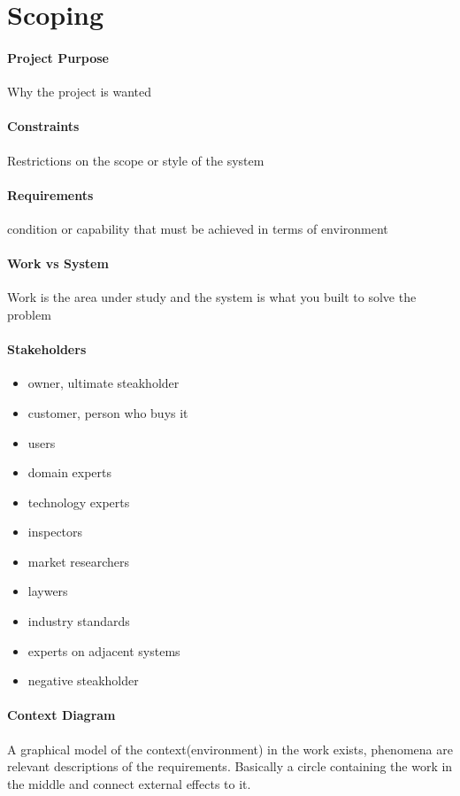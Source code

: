\documentclass[12pt]{article}
\begin{document}
\section*{Scoping}
\label{sec:scoping}
\paragraph{Project Purpose} 
\label{par:project_purpose}
Why the project is wanted

\paragraph{Constraints} 
\label{par:constraints}	
Restrictions on the scope or style of the system

\paragraph{Requirements} 
\label{par:requriements}
condition or capability that must be achieved in terms of environment
	
\paragraph{Work vs System} 
\label{par:work_vs_system}
Work is the area under study and the system is what you built to solve the problem

\paragraph{Stakeholders} 
\label{par:stakeholders}
\begin{itemize}
	\item owner, ultimate steakholder
	\item customer, person who buys it
	\item users
	\item domain experts
	\item technology experts
	\item inspectors
	\item market researchers
	\item laywers
	\item industry standards
	\item experts on adjacent systems
	\item negative steakholder
\end{itemize}


\paragraph{Context Diagram} 
\label{par:context_diagram}
A graphical model of the context(environment) in the work exists, phenomena are relevant descriptions of the requirements. Basically a circle containing the work in the middle and connect external effects to it. 
\end{document}
